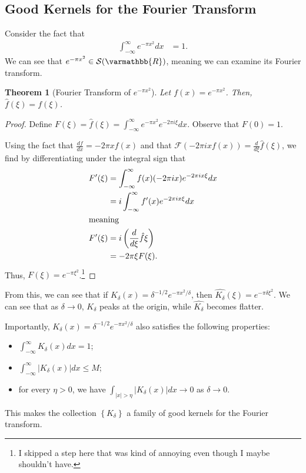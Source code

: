 \documentclass[12pt]{extarticle}
\newcommand{\R}{\varmathbb{R}}
\newcommand{\set}[1]{\left\{#1\right\}}
\theoremstyle{plain}
\newtheorem*{theorem}{Theorem}%
\theoremstyle{definition}
\theoremstyle{remark}
\renewcommand{\newline}{\hfill\break}
\begin{document}
  \subsection{Good Kernels for the Fourier Transform}%
  Consider the fact that
  \begin{align*}
    \int_{-\infty}^{\infty}e^{-\pi x^2}dx &= 1.
  \end{align*}
  We can see that $e^{-\pi x^2}\in \mathcal{S}(\R)$, meaning we can examine its Fourier transform.
  \begin{theorem}[Fourier Transform of $e^{-\pi x^2}$]
    Let $f(x) = e^{-\pi x^2}$. Then, $\hat{f}(\xi) = f(\xi)$.
  \end{theorem}
  \begin{proof}
    Define $F(\xi) = \hat{f}(\xi) = \int_{-\infty}^{\infty}e^{-\pi x^2}e^{-2\pi i \xi}dx$. Observe that $F(0) = 1$.\newline

    Using the fact that $\frac{df}{dx} = -2\pi x f(x)$ and that $\mathcal{F}\left(-2\pi i x f(x)\right) = \frac{d}{d\xi}\hat{f}(\xi)$, we find by differentiating under the integral sign that
    \begin{align*}
      F'(\xi) &= \int_{-\infty}^{\infty}f(x)(-2\pi i x)e^{-2\pi i x \xi}dx\\
              &= i\int_{-\infty}^{\infty}f'(x)e^{-2\pi i x \xi}dx\\
              \intertext{meaning}
      F'(\xi) &= i\left(\frac{d}{d\xi}\hat{f}\xi\right)\\
              &= -2\pi \xi F(\xi).
    \end{align*}
    Thus, $F(\xi) = e^{-\pi \xi^2}$.\footnote{I skipped a step here that was kind of annoying even though I maybe shouldn't have.}
  \end{proof}
  From this, we can see that if $K_{\delta}(x) = \delta^{-1/2}e^{-\pi x^2/\delta}$, then $\widehat{K_{\delta}}(\xi) = e^{-\pi \delta \xi^2}$. We can see that as $\delta \rightarrow 0$, $K_{\delta}$ peaks at the origin, while $\widehat{K_{\delta}}$ becomes flatter.\newline

  Importantly, $K_{\delta}(x) = \delta^{-1/2}e^{-\pi x^2/\delta}$ also satisfies the following properties:
  \begin{itemize}
    \item $\displaystyle \int_{-\infty}^{\infty}K_{\delta}(x)dx = 1$;
    \item $\displaystyle \int_{-\infty}^{\infty}\left\vert K_{\delta}(x)\right\vert dx \leq M$;
    \item for every $\eta > 0$, we have $\displaystyle\int_{|x| > \eta}\left\vert K_{\delta}(x)\right\vert dx \rightarrow 0$ as $\delta \rightarrow 0$.
  \end{itemize}
  This makes the collection $\set{K_{\delta}}$ a family of good kernels for the Fourier transform.\newline
\end{document}
